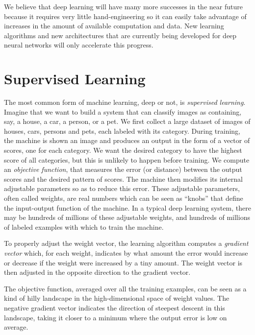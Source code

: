 \documentclass[10pts]{article}
\begin{document}
We believe that deep learning will have many more successes in the
near future because it requires very little hand-engineering so it can
easily take advantage of increases in the amount of available
computation and data. New learning algorithms and new architectures
that are currently being developed for deep neural networks will only
accelerate this progress.

\section{Supervised Learning}

The most common form of machine learning, deep or not, is {\em
  supervised learning}. Imagine that we want to build a system that
can classify images as containing, say, a house, a car, a person, or a
pet. We first collect a large dataset of images of houses, cars,
persons and pets, each labeled with its category. During training, the
machine is shown an image and produces an output in the form of
a vector of scores, one for each category. We want the desired
category to have the highest score of all categories, but this is
unlikely to happen before training.  We compute an {\em objective
  function}, that measures the error (or distance) between the output
scores and the desired pattern of scores. The machine then modifies
its internal adjustable parameters so as to reduce this error. These
adjustable parameters, often called weights, are real numbers which
can be seen as ``knobs'' that define the input-output function of the
machine. In a typical deep learning system, there may be hundreds of
millions of these adjustable weights, and hundreds of millions
of labeled examples with which to train the machine.

To properly adjust the weight vector, the learning algorithm computes
a {\em gradient vector} which, for each weight, indicates by what
amount the error would increase or decrease if the weight were
increased by a tiny amount. The weight vector is then adjusted in the
opposite direction to the gradient vector. 

The objective function, averaged over all the training examples, can
be seen as a kind of hilly landscape in the high-dimensional space of
weight values. The negative gradient vector indicates the direction of
steepest descent in this landscape, taking it closer to a minimum
where the output error is low on average.
\end{document}
